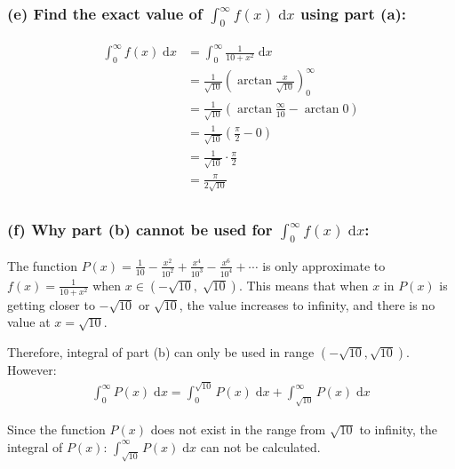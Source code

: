 \documentclass[12pt]{article}
\begin{document}
\subsubsection*{(e) Find the exact value of ${\displaystyle \int_0^{\infty} f(x) \;\mathrm{d}x}$ using part (a):}
\begin{align*}
    \int_0^{\infty} f(x) \;\mathrm{d}x &= \int_0^{\infty} \frac{1}{10+x^2} \;\mathrm{d}x\\
    &= \frac{1}{\sqrt{10}} \left( \arctan{\frac{x}{\sqrt{10}}} \right)_0^{\infty}\\
    &= \frac{1}{\sqrt{10}} \left( \arctan{\frac{\infty}{10}} -\arctan{0} \right)\\
    &= \frac{1}{\sqrt{10}} \left( \frac{\pi}{2} -0 \right)\\
    &= \frac{1}{\sqrt{10}}\cdot \frac{\pi}{2} \\
    &= \frac{\pi}{2\sqrt{10}}\\
\end{align*}





\subsubsection*{(f) Why part (b) cannot be used for ${\displaystyle \int_0^{\infty} f(x) \;\mathrm{d}x}$:}

\noindent The function $\displaystyle P(x)=\frac{1}{10}- \frac{x^2}{10^2}+ \frac{x^4}{10^3}- \frac{x^6}{10^4}+ \cdots$ is only approximate to $\displaystyle f(x)=\frac{1}{10+ x^2}$ when $\displaystyle x\in \left(-\sqrt{10},\; \sqrt{10} \right)$. This means that when $x$ in $P(x)$ is getting closer to $\displaystyle -\sqrt{10}$ or $\displaystyle \sqrt{10}$, the value increases to infinity, and there is no value at $x= \sqrt{10}$. \par

\noindent Therefore, integral of part (b) can only be used in range $\displaystyle \left(-\sqrt{10}, \sqrt{10} \right)$. However:
\begin{align*}
    \int_0^\infty P(x) \;\mathrm{d}x
    = \int_0^{\sqrt{10}} P(x) \;\mathrm{d}x
    + \int_{\sqrt{10}}^{\infty} P(x) \;\mathrm{d}x
\end{align*}

\noindent Since the function $P(x)$ does not exist in the range from $\displaystyle \sqrt{10}$ to infinity, the integral of $P(x)$: $\displaystyle \int_{\sqrt{10}}^{\infty} P(x) \;\mathrm{d}x$ can not be calculated.
\end{document}
